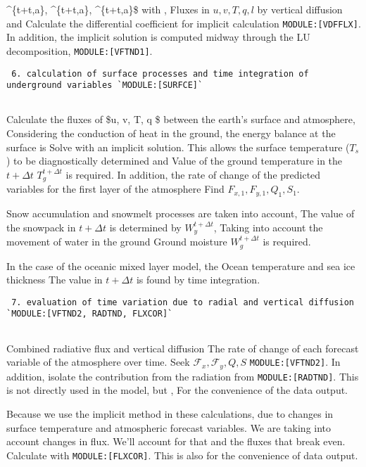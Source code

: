 \^{}\{t+\Delta t,a\}, \^{}\{t+\Delta t,a\},
\^{}\{t+\Delta t,a\}\$ with , Fluxes in \(u, v, T, q, l\) by
vertical diffusion and Calculate the differential coefficient for
implicit calculation \texttt{MODULE:{[}VDFFLX{]}}. In addition, the
implicit solution is computed midway through the LU decomposition,
\texttt{MODULE:{[}VFTND1{]}}.

\begin{verbatim}
 6. calculation of surface processes and time integration of underground variables `MODULE:[SURFCE]`
     
\end{verbatim}

Calculate the fluxes of \$u, v, T, q \$ between the earth's surface and
atmosphere, Considering the conduction of heat in the ground, the energy
balance at the surface is Solve with an implicit solution. This allows
the surface temperature (\(T_s\)) to be diagnostically determined and
Value of the ground temperature in the \(t+\Delta t\)
\(T_g^{t+\Delta t}\) is required. In addition, the rate of change of the
predicted variables for the first layer of the atmosphere Find
\(F_{x,1}, F_{y,1}, Q_1, S_1\).

Snow accumulation and snowmelt processes are taken into account, The
value of the snowpack in \(t+\Delta t\) is determined by
\(W_y^{t+\Delta t}\), Taking into account the movement of water in the
ground Ground moisture \(W_g^{t+\Delta t}\) is required.

In the case of the oceanic mixed layer model, the Ocean temperature and
sea ice thickness The value in \(t+\Delta t\) is found by time
integration.

\begin{verbatim}
 7. evaluation of time variation due to radial and vertical diffusion `MODULE:[VFTND2, RADTND, FLXCOR]`
     
\end{verbatim}

Combined radiative flux and vertical diffusion The rate of change of
each forecast variable of the atmosphere over time. Seek
\({\mathcal F}_x, {\mathcal F}_y, Q, S\) \texttt{MODULE:{[}VFTND2{]}}.
In addition, isolate the contribution from the radiation from
\texttt{MODULE:{[}RADTND{]}}. This is not directly used in the model,
but , For the convenience of the data output.

Because we use the implicit method in these calculations, due to changes
in surface temperature and atmospheric forecast variables. We are taking
into account changes in flux. We'll account for that and the fluxes that
break even. Calculate with \texttt{MODULE:{[}FLXCOR{]}}. This is also
for the convenience of data output.

